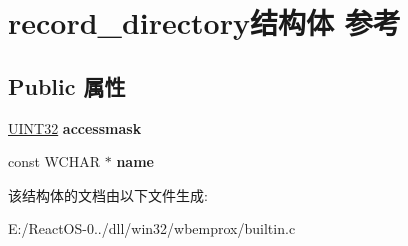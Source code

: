 \hypertarget{structrecord__directory}{}\section{record\+\_\+directory结构体 参考}
\label{structrecord__directory}
\subsection*{Public 属性}
\begin{DoxyCompactItemize}
\item 
\mbox{\label{structrecord__directory_a7ceee5d6b14617d020627c18f6a04258}} 
\hyperlink{_processor_bind_8h_ae1e6edbbc26d6fbc71a90190d0266018}{U\+I\+N\+T32} {\bfseries accessmask}
\item 
\mbox{\label{structrecord__directory_aa5f46e6da0eed265735d6ac70f4eb4e5}} 
const W\+C\+H\+AR $\ast$ {\bfseries name}
\end{DoxyCompactItemize}


该结构体的文档由以下文件生成\+:\begin{DoxyCompactItemize}
\item 
E\+:/\+React\+O\+S-\/0../dll/win32/wbemprox/builtin.\+c\end{DoxyCompactItemize}
